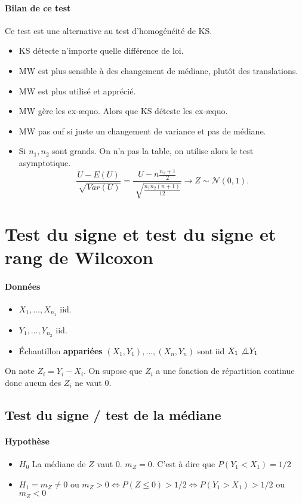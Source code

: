 \documentclass{article}
\theoremstyle{plain}%
\theoremstyle{definition}
\theoremstyle{remark}
\begin{document}
\paragraph*{Bilan de ce test} Ce test est une alternative au test d'homogénéité de KS.
\begin{itemize}
    \item KS détecte n'importe quelle différence de loi. 
    \item MW est plus sensible à des changement de médiane, plutôt des translations.
    \item MW est plus utilisé et apprécié.
    \item MW gère les ex-æquo. Alors que KS déteste les ex-æquo.
    \item MW pas ouf si juste un changement de variance et pas de médiane.
    \item Si $ n_1, n_2 $ sont grands. On n'a pas la table, on utilise alors le test asymptotique.
    \[
        \frac{U - E(U)}{\sqrt[]{Var(U)}} = \frac{U - n \frac{n_1 + 1}{2}}{\sqrt[]{\frac{n_1 n_2 (n+1)}{12}}} \to Z \sim \mathcal{N}(0,1)
    .\]
\end{itemize}

\section{Test du signe et test du signe et rang de Wilcoxon}
\paragraph*{Données}
\begin{itemize}
    \item $ X_1, \dots, X_{n_1}  $ iid. 
    \item $ Y_1, \dots, Y_{n_2}  $ iid. 
    \item Échantillon \textbf{appariées} $ (X_1, Y_1), \dots, (X_n, Y_n) $ sont iid $ X_1 \not \bot Y_1 $ 
\end{itemize}
On note $ Z_i = Y_i - X_i $. On supose que $ Z_i $  a une fonction de répartition continue donc aucun des $ Z_i $ ne vaut 0.

\subsection{Test du signe / test de la médiane}

\paragraph*{Hypothèse}
\begin{itemize}
    \item $ H_0 $ La médiane de $ Z $ vaut 0. $ m_Z = 0 $. C'est à dire que $ P(Y_1 < X_1) = 1/2 $ 
    \item $ H_1 = m_Z \neq 0 $ ou $ m_Z > 0 \Leftrightarrow P(Z \leq 0) > 1/2 \Leftrightarrow P(Y_1 > X_1) > 1/2$ ou $ m_Z < 0 $ 
\end{itemize}
\end{document}
